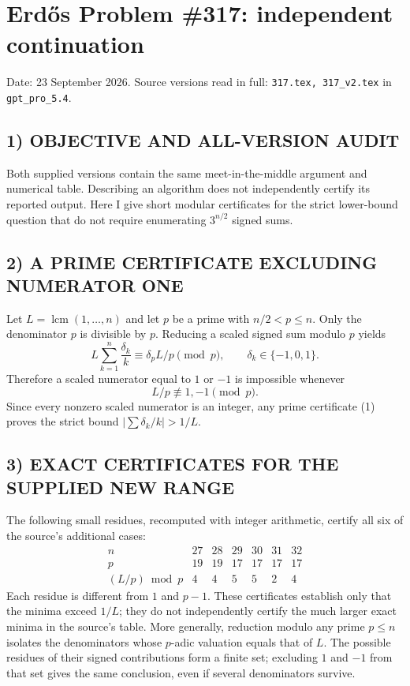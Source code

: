 \section{Erd\H{o}s Problem \#317: independent continuation}
\noindent Date: 23 September 2026. Source versions read in full: \texttt{317.tex, 317\_v2.tex} in \texttt{gpt\_pro\_5.4}.

\subsection*{1) OBJECTIVE AND ALL-VERSION AUDIT}
Both supplied versions contain the same meet-in-the-middle argument and numerical table. Describing an algorithm does not independently certify its reported output. Here I give short modular certificates for the strict lower-bound question that do not require enumerating $3^{n/2}$ signed sums.
\subsection*{2) A PRIME CERTIFICATE EXCLUDING NUMERATOR ONE}
Let $L=\operatorname{lcm}(1,\ldots,n)$ and let $p$ be a prime with $n/2<p\le n$. Only the denominator $p$ is divisible by $p$. Reducing a scaled signed sum modulo $p$ yields
\[
L\sum_{k=1}^n\frac{\delta_k}{k}\equiv\delta_p L/p\pmod p,
\qquad\delta_k\in\{-1,0,1\}.
\]
Therefore a scaled numerator equal to $1$ or $-1$ is impossible whenever
\[
L/p\not\equiv1,-1\pmod p. \tag{1}
\]
Since every nonzero scaled numerator is an integer, any prime certificate (1) proves the strict bound $|\sum\delta_k/k|>1/L$.
\subsection*{3) EXACT CERTIFICATES FOR THE SUPPLIED NEW RANGE}
The following small residues, recomputed with integer arithmetic, certify all six of the source's additional cases:
\[
\begin{array}{c|rrrrrr}
n&27&28&29&30&31&32\\\hline
p&19&19&17&17&17&17\\
(L/p)\bmod p&4&4&5&5&2&4
\end{array}
\]
Each residue is different from $1$ and $p-1$. These certificates establish only that the minima exceed $1/L$; they do not independently certify the much larger exact minima in the source's table.
More generally, reduction modulo any prime $p\le n$ isolates the denominators whose $p$-adic valuation equals that of $L$. The possible residues of their signed contributions form a finite set; excluding $1$ and $-1$ from that set gives the same conclusion, even if several denominators survive.
